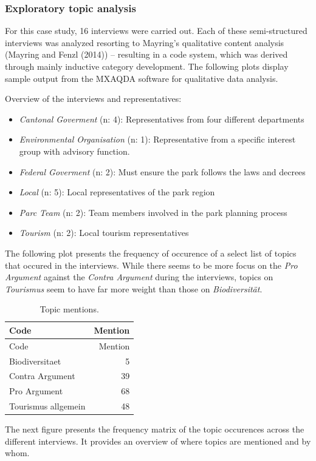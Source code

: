 \documentclass[]{article}
\providecommand{\tightlist}{%
  \setlength{\itemsep}{0pt}\setlength{\parskip}{0pt}}
\begin{document}
\subsubsection{Exploratory topic
analysis}\label{exploratory-topic-analysis}

For this case study, 16 interviews were carried out. Each of these
semi-structured interviews was analyzed resorting to Mayring's
qualitative content analysis (Mayring and Fenzl (2014)) -- resulting in
a code system, which was derived through mainly inductive category
development. The following plots display sample output from the MXAQDA
software for qualitative data analysis.

Overview of the interviews and representatives:

\begin{itemize}
\tightlist
\item
  \emph{Cantonal Goverment} (n: 4): Representatives from four different
  departments
\item
  \emph{Environmental Organisation} (n: 1): Representative from a
  specific interest group with advisory function.
\item
  \emph{Federal Goverment} (n: 2): Must ensure the park follows the laws
  and decrees
\item
  \emph{Local} (n: 5): Local representatives of the park region
\item
  \emph{Parc Team} (n: 2): Team members involved in the park planning
  process
\item
  \emph{Tourism} (n: 2): Local tourism representatives
\end{itemize}

The following plot presents the frequency of occurence of a select list
of topics that occured in the interviews. While there seems to be more
focus on the \emph{Pro Argument} against the \emph{Contra Argument}
during the interviews, topics on \emph{Tourismus} seem to have far more
weight than those on \emph{Biodiversität}.

\begin{longtable}[]{@{}lr@{}}
\caption{Topic mentions.}\tabularnewline
\toprule
Code & Mention\tabularnewline
\midrule
\endfirsthead
\toprule
Code & Mention\tabularnewline
\midrule
\endhead
Biodiversitaet & 5\tabularnewline
Contra Argument & 39\tabularnewline
Pro Argument & 68\tabularnewline
Tourismus allgemein & 48\tabularnewline
\bottomrule
\end{longtable}

The next figure presents the frequency matrix of the topic occurences
across the different interviews. It provides an overview of where topics
are mentioned and by whom.
\end{document}
